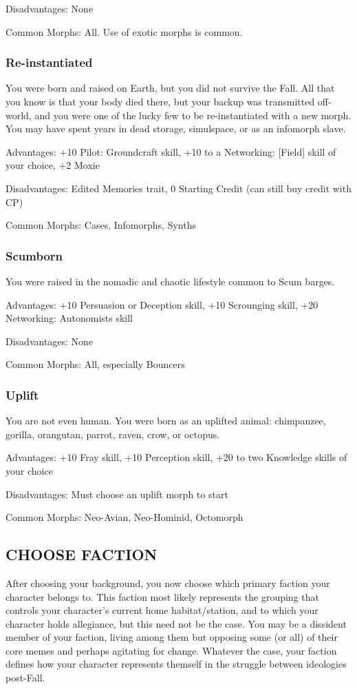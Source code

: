 Disadvantages: None

Common Morphs: All. Use of exotic morphs is common.

\subsubsection{Re-instantiated} %
You were born and raised on Earth, but you did not survive the Fall. All that
you know is that your body died there, but your backup was transmitted
off-world, and you were one of the lucky few to be re-instantiated with a new
morph. You may have spent years in dead storage, simulspace, or as an infomorph
slave.
 
Advantages: +10 Pilot: Groundcraft skill, +10 to a Networking: [Field] skill of
your choice, +2 Moxie
 
Disadvantages: Edited Memories trait, 0 Starting Credit (can still buy credit
with CP)
 
Common Morphs: Cases, Infomorphs, Synths

\subsubsection{Scumborn} %
You were raised in the nomadic and chaotic lifestyle common to Scum barges.
 
Advantages: +10 Persuasion or Deception skill, +10 Scrounging skill, +20
Networking: Autonomists skill
 
Disadvantages: None

Common Morphs: All, especially Bouncers

\subsubsection{Uplift} %
You are not even human. You were born as an uplifted animal: chimpanzee,
gorilla, orangutan, parrot, raven, crow, or octopus.

Advantages: +10 Fray skill, +10 Perception skill, +20 to two Knowledge skills
of your choice

Disadvantages: Must choose an uplift morph to start

Common Morphs: Neo-Avian, Neo-Hominid, Octomorph

\subsection{CHOOSE FACTION}
After choosing your background, you now choose which primary faction your
character belongs to.  This faction most likely represents the grouping that
controls your character’s current home habitat/station, and to which your
character holds allegiance, but this need not be the case. You may be a
dissident member of your faction, living among them but opposing some (or all)
of their core memes and perhaps agitating for change. Whatever the case, your
faction defines how your character represents themself in the struggle between
ideologies post-Fall.

